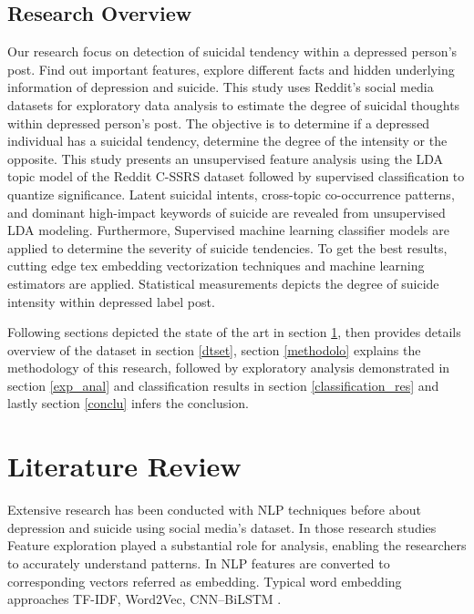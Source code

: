 \documentclass[sn-mathphys,Numbered]{sn-jnl}%
\theoremstyle{thmstyleone}%
\theoremstyle{thmstyletwo}%
\theoremstyle{thmstylethree}%
\begin{document}
\subsection{Research Overview}\label{overview}
Our research focus on detection of suicidal tendency within a depressed person’s post. Find out important features, explore different facts and hidden underlying information of depression and suicide. This study uses Reddit's social media datasets for exploratory data analysis to estimate the degree of suicidal thoughts within depressed person's post. The objective is to determine if a depressed individual has a suicidal tendency, determine the degree of the intensity or the opposite. This study presents an unsupervised feature analysis using the LDA topic model of the Reddit C-SSRS dataset followed by supervised classification to quantize significance. Latent suicidal intents, cross-topic co-occurrence patterns, and dominant high-impact keywords of suicide are revealed from unsupervised LDA modeling. Furthermore, Supervised machine learning classifier models are applied to determine the severity of suicide tendencies. To get the best results, cutting edge tex embedding vectorization techniques and machine learning estimators are applied. Statistical measurements depicts the degree of suicide intensity within depressed label post. 

Following sections depicted the state of the art in section \ref{lit_rev}, then provides details overview of the dataset in section \ref{dtset}, section \ref{methodolo} explains the methodology of this research, followed by exploratory analysis demonstrated in section \ref{exp_anal} and classification results in section \ref{classification_res} and lastly section \ref{conclu} infers the conclusion. 

\section{Literature Review}
\label{lit_rev}
Extensive research has been conducted with NLP techniques before about depression and suicide using social media's dataset. In those research studies Feature exploration played a substantial role for analysis, enabling the researchers to accurately understand patterns. In NLP features are converted to corresponding vectors referred as embedding. Typical word embedding approaches TF-IDF, Word2Vec, CNN–BiLSTM \cite{aldhyani2022detecting, chancellor2020methods, wang2020depression, malhotra2022deep}. 
\end{document}
